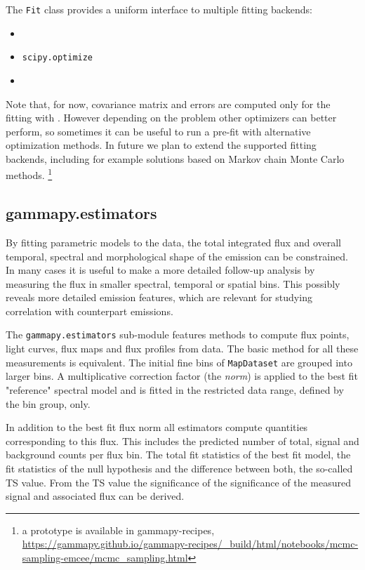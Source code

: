 \documentclass[traditabstract, longauth]{aa}
\newcommand{\code}[1]{\texttt{#1}}
\begin{document}
The \code{Fit} class provides a uniform interface to multiple fitting backends:

\begin{itemize}
	\item \iminuit~\citep{iminuit}
	\item \code{scipy.optimize}~\citep{2020SciPy-NMeth}
	\item \sherpa~\citep{sherpa-2011}
\end{itemize}

Note that, for now, covariance matrix and errors are computed only for the fitting with 
\iminuit. However depending on
the problem other optimizers can better perform, so sometimes it can be useful
to run a pre-fit with alternative optimization methods. In future we plan to
extend the supported fitting backends, including for example solutions based on Markov chain Monte Carlo methods.
\footnote{a prototype is available in gammapy-recipes,
	\url{https://gammapy.github.io/gammapy-recipes/_build/html/notebooks/mcmc-sampling-emcee/mcmc_sampling.html}
}

\subsection{gammapy.estimators}
\label{ssec:gammapy-estimators}
By fitting parametric models to the data, the total integrated
flux and overall temporal, spectral and morphological shape of the
\gammaray emission can be constrained. In many cases it is useful
to make a more detailed follow-up analysis by measuring the
flux in smaller spectral, temporal or spatial bins. This
possibly reveals more detailed emission features, which
are relevant for studying correlation with counterpart emissions.

The \code{gammapy.estimators} sub-module features methods to compute flux
points, light curves, flux maps and flux profiles from data.
The basic method for all these measurements is equivalent.
The initial fine bins of \code{MapDataset} are grouped into
larger bins. A multiplicative correction factor (the \textit{norm})
is applied to the best fit "reference" spectral
model and is fitted in the restricted data range, defined by the 
bin group, only.

In addition to the best fit flux norm all estimators compute
quantities corresponding to this flux. This includes
the predicted number of total, signal and background
counts per flux bin. The total fit statistics
of the best fit model, the fit statistics of the
null hypothesis and the difference between both,
the so-called TS value.
From the TS value the significance of the
significance of the measured signal and associated flux
can be derived.
\end{document}
